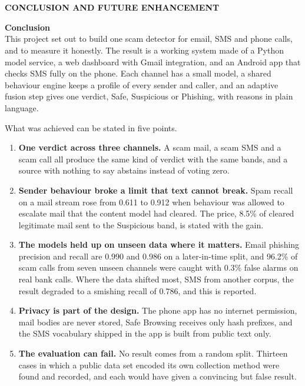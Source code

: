 \chapter*{}                  %
\graphicspath{{Chapter6/}}
{

\begin{center}
{\bfseries\Huge CONCLUSION AND FUTURE ENHANCEMENT}
\end{center}
\vspace{0.4cm}

\noindent\textbf{\Large Conclusion}\\[0.2cm]
This project set out to build one scam detector for email, SMS and phone calls, and to measure it honestly. The result is a working system made of a Python model service, a web dashboard with Gmail integration, and an Android app that checks SMS fully on the phone. Each channel has a small model, a shared behaviour engine keeps a profile of every sender and caller, and an adaptive fusion step gives one verdict, Safe, Suspicious or Phishing, with reasons in plain language.

What was achieved can be stated in five points.
\begin{enumerate}
\item \textbf{One verdict across three channels.} A scam mail, a scam SMS and a scam call all produce the same kind of verdict with the same bands, and a source with nothing to say abstains instead of voting zero.
\item \textbf{Sender behaviour broke a limit that text cannot break.} Spam recall on a mail stream rose from 0.611 to 0.912 when behaviour was allowed to escalate mail that the content model had cleared. The price, 8.5\% of cleared legitimate mail sent to the Suspicious band, is stated with the gain.
\item \textbf{The models held up on unseen data where it matters.} Email phishing precision and recall are 0.990 and 0.986 on a later-in-time split, and 96.2\% of scam calls from seven unseen channels were caught with 0.3\% false alarms on real bank calls. Where the data shifted most, SMS from another corpus, the result degraded to a smishing recall of 0.786, and this is reported.
\item \textbf{Privacy is part of the design.} The phone app has no internet permission, mail bodies are never stored, Safe Browsing receives only hash prefixes, and the SMS vocabulary shipped in the app is built from public text only.
\item \textbf{The evaluation can fail.} No result comes from a random split. Thirteen cases in which a public data set encoded its own collection method were found and recorded, and each would have given a convincing but false result.
\end{enumerate}

}
